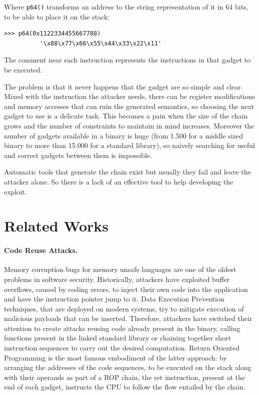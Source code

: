 \documentclass[twocolumn, 11pt]{article}
\begin{document}
\bigskip
Where \texttt{p64()} transforms an address to the string representation of it in 64 bits, to be able to place it on the stack:
\begin{lstlisting}
>>> p64(0x1122334455667788)
          '\x88\x77\x66\x55\x44\x33\x22\x11'
\end{lstlisting}

The comment near each instruction represents the instructions in that gadget to be executed.

\bigskip
The problem is that it never happens that the gadget are so simple and clear. Mixed with the instruction the attacker needs, there can be register modifications and memory accesses that can ruin the generated semantics, so choosing the next gadget to use is a delicate task. This becomes a pain when the size of the chain grows and the number of constraints to maintain in mind increases.
Moreover the number of gadgets available in a binary is huge (from 1.500 for a middle sized binary to more than 15.000 for a standard library), so naively searching for useful and correct gadgets between them is impossible.

 Automatic tools that generate the chain exist but usually they fail and leave the attacker alone. So there is a lack of an effective tool to help developing the exploit.

\section{Related Works}
\label{se:related}
\paragraph{Code Reuse Attacks.}
Memory corruption bugs for memory unsafe languages are one of the oldest problems in software security. Historically, attackers have exploited buffer overflows, caused by coding errors, to inject their own code into the application and have the instruction pointer jump to it. Data Execution Prevention techniques, that are deployed on modern systems, try to mitigate execution of malicious payloads that can be inserted. Therefore, attackers have switched their attention to create attacks reusing code already present in the binary, calling functions present in the linked standard library or chaining together short instruction sequences to carry out the desired computation. Return Oriented Programming is the most famous embodiment of the latter approach: by arranging the addresses of the code sequences, to be executed on the stack along with their operands as  part  of  a  ROP  chain, the ret instruction, present at the end of each gadget, instructs the CPU to follow the flow entailed by the chain.
\end{document}
